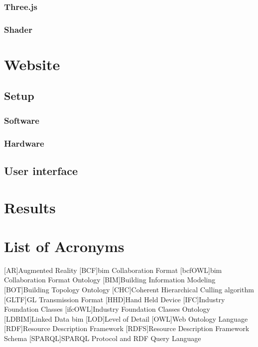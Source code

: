 \documentclass[12pt,a4paper,faculty=ea,language=en,doctype=report]{ugent-doc}
\begin{document}
    \subsection{Three.js}
    \subsection{Shader}

\chapter{Website}
  \section{Setup}
    \subsection{Software}
    \subsection{Hardware}
  \section{User interface}

\chapter{Results}


% 
\clearpage
\chapter*{List of Acronyms}
\begin{acronym}[JSONP]\itemsep2pt\hypersetup{hidelinks}
  [AR]{Augmented Reality}
  [BCF]{\acs{bim} Collaboration Format}
  [bcfOWL]{\acs{bim} Collaboration Format Ontology}
  [BIM]{Building Information Modeling}
  [BOT]{Building Topology Ontology}
  [CHC]{Coherent Hierarchical Culling algorithm}
  [GLTF]{GL Transmission Format}
  [HHD]{Hand Held Device}
  [IFC]{Industry Foundation Classes}
  [ifcOWL]{Industry Foundation Classes Ontology}
  [LDBIM]{Linked Data \acs{bim}}
  [LOD]{Level of Detail}
  [OWL]{Web Ontology Language}
  [RDF]{Resource Description Framework}
  [RDFS]{Resource Description Framework Schema}
  [SPARQL]{SPARQL Protocol and RDF Query Language}
\end{acronym}

\printbibliography[heading=bibintoc,title={References}]
\end{document}
